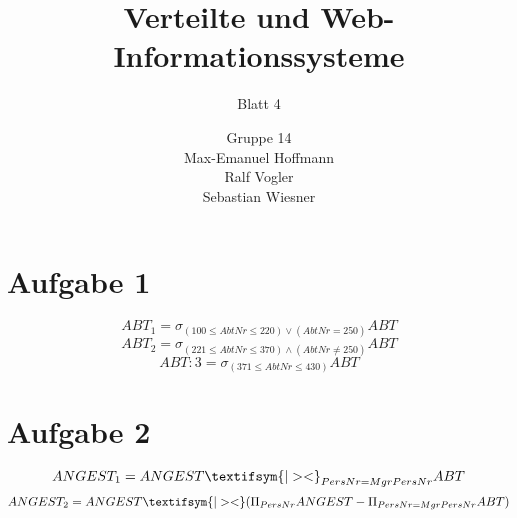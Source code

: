 \documentclass[11pt,a4paper]{scrartcl}
\begin{document}
\author{Gruppe 14\\Max-Emanuel Hoffmann\\Ralf Vogler\\Sebastian Wiesner}
\title{Verteilte und Web-Informationssysteme}
\subtitle{Blatt 4}

\maketitle

\section*{Aufgabe 1}
\begin{displaymath}
ABT_1 = \sigma_{(100 \leq AbtNr \leq 220) \vee (AbtNr = 250)} ABT
\end{displaymath}
\begin{displaymath}
ABT_2 = \sigma_{(221 \leq AbtNr \leq 370) \wedge (AbtNr \neq 250)} ABT
\end{displaymath}
\begin{displaymath}
ABT:3 = \sigma_{(371 \leq AbtNr \leq 430)} ABT
\end{displaymath}

\section*{Aufgabe 2}
\begin{displaymath}
ANGEST_1 = ANGEST \textifsym{|><} _{PersNr=MgrPersNr} ABT
\end{displaymath}
\begin{displaymath}
ANGEST_2 = ANGEST \textifsym{|><} (\Pi_{PersNr}ANGEST - \Pi_{PersNr=MgrPersNr} ABT)
\end{displaymath}
\end{document}
